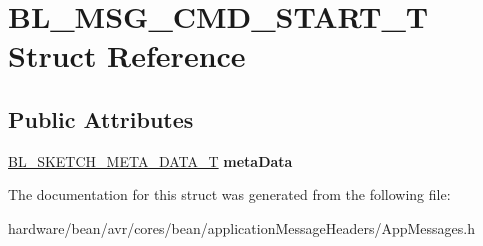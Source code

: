 \hypertarget{struct_b_l___m_s_g___c_m_d___s_t_a_r_t___t}{}\section{B\+L\+\_\+\+M\+S\+G\+\_\+\+C\+M\+D\+\_\+\+S\+T\+A\+R\+T\+\_\+\+T Struct Reference}
\label{struct_b_l___m_s_g___c_m_d___s_t_a_r_t___t}
\subsection*{Public Attributes}
\begin{DoxyCompactItemize}
\item 
\hypertarget{struct_b_l___m_s_g___c_m_d___s_t_a_r_t___t_ae10257f15699ce3b59839bad5767ae06}{}\hyperlink{struct_b_l___s_k_e_t_c_h___m_e_t_a___d_a_t_a___t}{B\+L\+\_\+\+S\+K\+E\+T\+C\+H\+\_\+\+M\+E\+T\+A\+\_\+\+D\+A\+T\+A\+\_\+\+T} {\bfseries meta\+Data}\label{struct_b_l___m_s_g___c_m_d___s_t_a_r_t___t_ae10257f15699ce3b59839bad5767ae06}

\end{DoxyCompactItemize}


The documentation for this struct was generated from the following file\+:\begin{DoxyCompactItemize}
\item 
hardware/bean/avr/cores/bean/application\+Message\+Headers/App\+Messages.\+h\end{DoxyCompactItemize}
